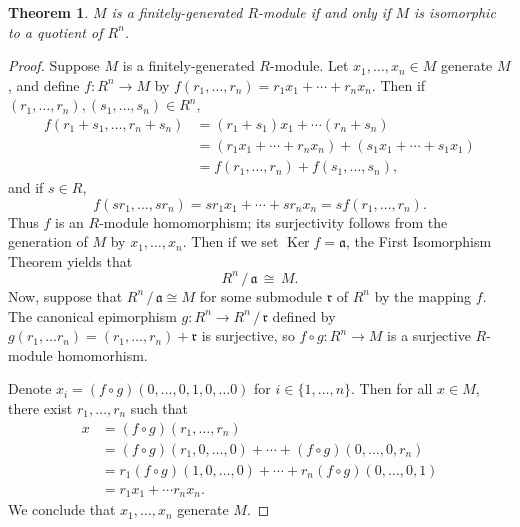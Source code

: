 \documentclass[11pt]{article}
\newtheorem{theorem}{Theorem}
\newcommand{\Ker}{\operatorname{Ker}}
\begin{document}
\begin{adjustwidth}{0.5cm}{}
	\begin{theorem}
		$M$ is a finitely-generated $R$-module if and only if $M$ is isomorphic to a quotient of $R^{n}$.
	\end{theorem}
	\begin{proof}
		Suppose $M$ is a finitely-generated $R$-module. Let $x_{1}, \ldots, x_{n} \in M$ generate $M$, and define $f : R^{n} \to M$ by $f(r_{1}, \ldots, r_{n}) = r_{1}x_{1} + \cdots + r_{n}x_{n}$. Then if $(r_{1}, \ldots, r_{n}), (s_{1}, \ldots, s_{n}) \in R^{n}$,
		\begin{align*}
			f(r_{1} + s_{1}, \ldots, r_{n} + s_{n}) &= (r_{1} + s_{1}) x_{1} + \cdots(r_{n} + s_{n}) \\
			&= (r_{1}x_{1} + \cdots + r_{n}x_{n}) + (s_{1}x_{1} + \cdots + s_{1}x_{1}) \\
			&= f(r_{1}, \ldots, r_{n}) + f(s_{1}, \ldots, s_{n}),
		\end{align*}
		and if $s \in R$,
		\[
			f(s r_{1}, \ldots, s r_{n}) = s r_{1} x_{1} + \cdots + s r_{n} x_{n} = s f(r_{1}, \ldots, r_{n}).
		\]
		Thus $f$ is an $R$-module homomorphism; its surjectivity follows from the generation of $M$ by $x_{1}, \ldots, x_{n}$. Then if we set $\Ker f = \mathfrak{a}$, the First Isomorphism Theorem yields that
		\[
			R^{n} \,/\, \mathfrak{a} \, \cong \, M.
		\]
		Now, suppose that $R^{n} \,/\, \mathfrak{a} \cong M$ for some submodule $\mathfrak{r}$ of $R^{n}$ by the mapping $f$. The canonical epimorphism $g : R^{n} \to R^{n} \,/\, \mathfrak{r}$ defined by $g(r_{1}, \ldots r_{n}) = (r_{1}, \ldots, r_{n}) + \mathfrak{r}$ is surjective, so $f \circ g : R^{n} \to M$ is a surjective $R$-module homomorhism.

		Denote $x_{i} = (f \circ g) (0, \ldots, 0, 1, 0, \ldots 0)$ for $i \in \{ 1, \ldots, n \}$. Then for all $x \in M$, there exist $r_{1}, \ldots, r_{n}$ such that
		\begin{align*}
			x &= (f \circ g)(r_{1}, \ldots, r_{n}) \\
			&= (f \circ g)(r_{1}, 0, \ldots, 0) + \cdots + (f \circ g)(0, \ldots, 0, r_{n}) \\
			&= r_{1} (f \circ g)(1, 0, \ldots, 0) + \cdots + r_{n} (f \circ g)(0, \ldots, 0, 1) \\
			&= r_{1} x_{1} + \cdots r_{n} x_{n}.
		\end{align*}
		We conclude that $x_{1}, \ldots, x_{n}$ generate $M$.
	\end{proof}
\end{adjustwidth}
\end{document}
